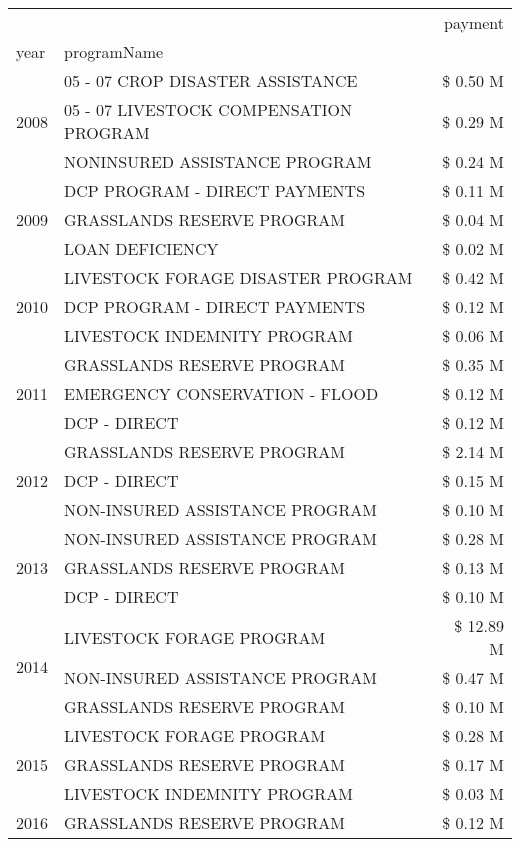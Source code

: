 \begin{tabular}{llr}
\toprule
 &  & payment \\
year & programName &  \\
\midrule
\multirow[t]{3}{*}{2008} & 05 - 07 CROP DISASTER ASSISTANCE & \$ 0.50 M \\
 & 05 - 07 LIVESTOCK COMPENSATION PROGRAM & \$ 0.29 M \\
 & NONINSURED ASSISTANCE PROGRAM & \$ 0.24 M \\
\cline{1-3}
\multirow[t]{3}{*}{2009} & DCP PROGRAM - DIRECT PAYMENTS & \$ 0.11 M \\
 & GRASSLANDS RESERVE PROGRAM & \$ 0.04 M \\
 & LOAN DEFICIENCY & \$ 0.02 M \\
\cline{1-3}
\multirow[t]{3}{*}{2010} & LIVESTOCK FORAGE DISASTER  PROGRAM & \$ 0.42 M \\
 & DCP PROGRAM - DIRECT PAYMENTS & \$ 0.12 M \\
 & LIVESTOCK INDEMNITY PROGRAM & \$ 0.06 M \\
\cline{1-3}
\multirow[t]{3}{*}{2011} & GRASSLANDS RESERVE PROGRAM & \$ 0.35 M \\
 & EMERGENCY CONSERVATION - FLOOD & \$ 0.12 M \\
 & DCP - DIRECT & \$ 0.12 M \\
\cline{1-3}
\multirow[t]{3}{*}{2012} & GRASSLANDS RESERVE PROGRAM & \$ 2.14 M \\
 & DCP - DIRECT & \$ 0.15 M \\
 & NON-INSURED ASSISTANCE PROGRAM & \$ 0.10 M \\
\cline{1-3}
\multirow[t]{3}{*}{2013} & NON-INSURED ASSISTANCE PROGRAM & \$ 0.28 M \\
 & GRASSLANDS RESERVE PROGRAM & \$ 0.13 M \\
 & DCP - DIRECT & \$ 0.10 M \\
\cline{1-3}
\multirow[t]{3}{*}{2014} & LIVESTOCK FORAGE PROGRAM & \$ 12.89 M \\
 & NON-INSURED ASSISTANCE PROGRAM & \$ 0.47 M \\
 & GRASSLANDS RESERVE PROGRAM & \$ 0.10 M \\
\cline{1-3}
\multirow[t]{3}{*}{2015} & LIVESTOCK FORAGE PROGRAM & \$ 0.28 M \\
 & GRASSLANDS RESERVE PROGRAM & \$ 0.17 M \\
 & LIVESTOCK INDEMNITY PROGRAM & \$ 0.03 M \\
\cline{1-3}
\multirow[t]{3}{*}{2016} & GRASSLANDS RESERVE PROGRAM & \$ 0.12 M \\

\end{tabular}
